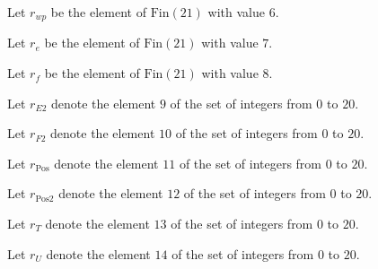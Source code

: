 \begin{definition}
\label{Complexity.Codec.rWp}
\leanok
Let $r_{wp}$ be the element of $\mathrm{Fin}(21)$ with value $6$.
\end{definition}

\begin{definition}
\label{Complexity.Codec.rE}
\leanok
Let $r_e$ be the element of $\mathrm{Fin}(21)$ with value $7$.
\end{definition}

\begin{definition}
\label{Complexity.Codec.rF}
\leanok
Let $r_f$ be the element of $\mathrm{Fin}(21)$ with value $8$.
\end{definition}

\begin{definition}
\label{Complexity.Codec.rE2}
\leanok
Let $r_{E2}$ denote the element $9$ of the set of integers from $0$ to $20$.
\end{definition}

\begin{definition}
\label{Complexity.Codec.rF2}
\leanok
Let $r_{F2}$ denote the element $10$ of the set of integers from $0$ to $20$.
\end{definition}

\begin{definition}
\label{Complexity.Codec.rPos}
\leanok
Let $r_{\mathrm{Pos}}$ denote the element $11$ of the set of integers from $0$ to $20$.
\end{definition}

\begin{definition}
\label{Complexity.Codec.rPos2}
\leanok
Let $r_{\mathrm{Pos2}}$ denote the element $12$ of the set of integers from $0$ to $20$.
\end{definition}

\begin{definition}
\label{Complexity.Codec.rT}
\leanok
Let $r_T$ denote the element $13$ of the set of integers from $0$ to $20$.
\end{definition}

\begin{definition}
\label{Complexity.Codec.rU}
\leanok
Let $r_U$ denote the element $14$ of the set of integers from $0$ to $20$.
\end{definition}

